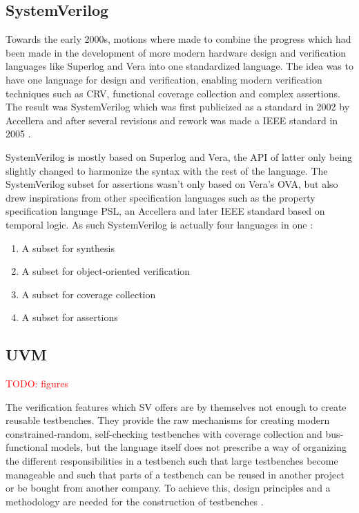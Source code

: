 \documentclass[11pt]{report}
\newcommand{\todo}[1]{\textcolor{red}{TODO: #1}}
\begin{document}
\subsection{SystemVerilog} %

Towards the early 2000s, motions where made to combine the progress which had been made in the development of more
modern hardware design and verification languages like Superlog and Vera into one standardized language. The idea was
to have one language for design and verification, enabling modern verification techniques such as CRV, functional
coverage collection and complex assertions. The result was SystemVerilog which was first publicized as a standard in
2002 by Accellera and after several revisions and rework was made a IEEE standard in 2005 \cite[Sec. 9]{flake2020a}.

SystemVerilog is mostly based on Superlog and Vera, the API of latter only being slightly changed to harmonize the
syntax with the rest of the language. The SystemVerilog subset for assertions wasn't only based on Vera's OVA, but
also drew inspirations from other specification languages such as the property specification language PSL, an
Accellera and later IEEE standard based on temporal logic. As such SystemVerilog is actually four languages in one
\cite[Ch. 1]{mehta2021introduction}:

\begin{enumerate}
  \item A subset for synthesis
  \item A subset for object-oriented verification
  \item A subset for coverage collection
  \item A subset for assertions
\end{enumerate}

\subsection{UVM} %

\todo{figures}

The verification features which SV offers are by themselves not enough to create reusable testbenches. They provide
the raw mechanisms for creating modern constrained-random, self-checking testbenches with coverage collection and
bus-functional models, but the language itself does not prescribe a way of organizing the different responsibilities
in a testbench such that large testbenches become manageable and such that parts of a testbench can be reused in
another project or be bought from another company. To achieve this, design principles and a methodology are needed for
the construction of testbenches \cite[Sec. 9.2]{flake2020a}.
\end{document}
